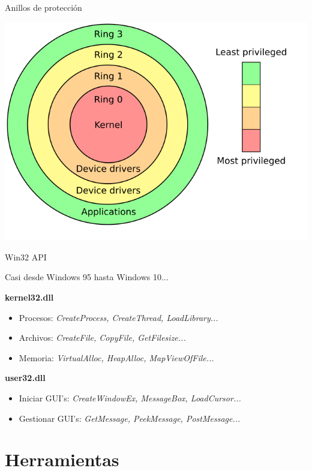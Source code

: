 \documentclass{beamer}
\begin{document}
\begin{frame}{Anillos de protección}
 \begin{center}
\includegraphics[scale=0.35]{Priv_rings.png}
\end{center}
\end{frame}

\begin{frame}{Win32 API}
\vspace{-4ex}
\begin{center}
Casi desde Windows 95 hasta Windows 10...
\end{center}
\vspace{-2ex}
\textbf{kernel32.dll}
\begin{itemize}
	\item Procesos: \textit{CreateProcess, CreateThread, LoadLibrary...}
	\item Archivos: \textit{CreateFile, CopyFile, GetFilesize...}
	\item Memoria: \textit{VirtualAlloc, HeapAlloc, MapViewOfFile...}
\end{itemize}
\textbf{user32.dll}
\begin{itemize}
	\item Iniciar GUI's: \textit{CreateWindowEx, MessageBox, LoadCursor...}
	\item Gestionar GUI's: \textit{GetMessage, PeekMessage, PostMessage...}
\end{itemize}

\end{frame}

\section{Herramientas}
\end{document}
